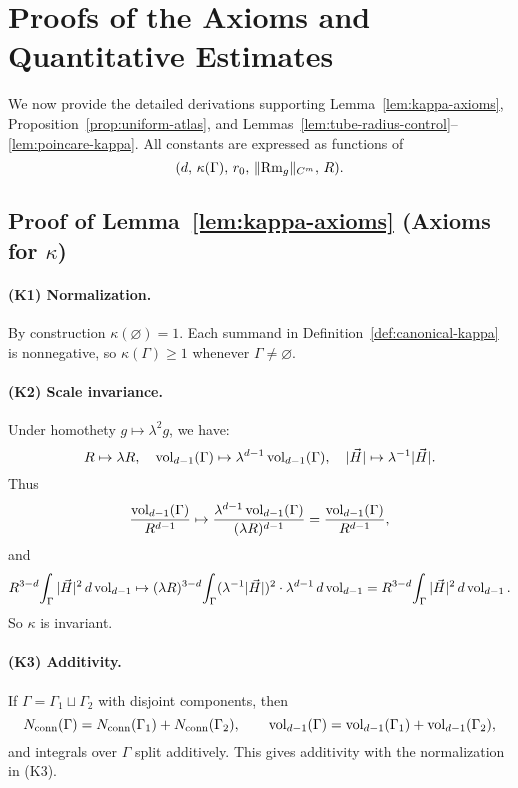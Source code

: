 \section{Proofs of the Axioms and Quantitative Estimates}
\label{sec:kappa-axioms-proofs}

We now provide the detailed derivations supporting Lemma~\ref{lem:kappa-axioms},
Proposition~\ref{prop:uniform-atlas}, and Lemmas~\ref{lem:tube-radius-control}--\ref{lem:poincare-kappa}.
All constants are expressed as functions of
\[
(d,\,\kappa(\Gamma),\,r_0,\,\|{\rm Rm}_g\|_{C^m},\,R).
\]

\subsection{Proof of Lemma~\ref{lem:kappa-axioms} (Axioms for $\kappa$)}

\paragraph{(K1) Normalization.}
By construction $\kappa(\varnothing)=1$. Each summand in Definition~\ref{def:canonical-kappa} is nonnegative,
so $\kappa(\Gamma)\ge 1$ whenever $\Gamma\neq\varnothing$.

\paragraph{(K2) Scale invariance.}
Under homothety $g\mapsto \lambda^2 g$, we have:
\[
R\mapsto \lambda R,\quad \operatorname{vol}_{d-1}(\Gamma)\mapsto \lambda^{d-1}\operatorname{vol}_{d-1}(\Gamma),\quad
|\vec H|\mapsto \lambda^{-1}|\vec H|.
\]
Thus
\[
\frac{\operatorname{vol}_{d-1}(\Gamma)}{R^{d-1}}\mapsto \frac{\lambda^{d-1}\operatorname{vol}_{d-1}(\Gamma)}{(\lambda R)^{d-1}}=\frac{\operatorname{vol}_{d-1}(\Gamma)}{R^{d-1}},
\]
and
\[
R^{3-d}\!\int_\Gamma |\vec H|^2\,d\operatorname{vol}_{d-1}\mapsto
(\lambda R)^{3-d}\!\int_\Gamma (\lambda^{-1}|\vec H|)^2\cdot \lambda^{d-1}\,d\operatorname{vol}_{d-1} = R^{3-d}\!\int_\Gamma |\vec H|^2\,d\operatorname{vol}_{d-1}.
\]
So $\kappa$ is invariant.

\paragraph{(K3) Additivity.}
If $\Gamma=\Gamma_1\sqcup\Gamma_2$ with disjoint components, then
\[
N_{\mathrm{conn}}(\Gamma)=N_{\mathrm{conn}}(\Gamma_1)+N_{\mathrm{conn}}(\Gamma_2),\qquad
\operatorname{vol}_{d-1}(\Gamma)=\operatorname{vol}_{d-1}(\Gamma_1)+\operatorname{vol}_{d-1}(\Gamma_2),
\]
and integrals over $\Gamma$ split additively. This gives additivity with the normalization in (K3).

